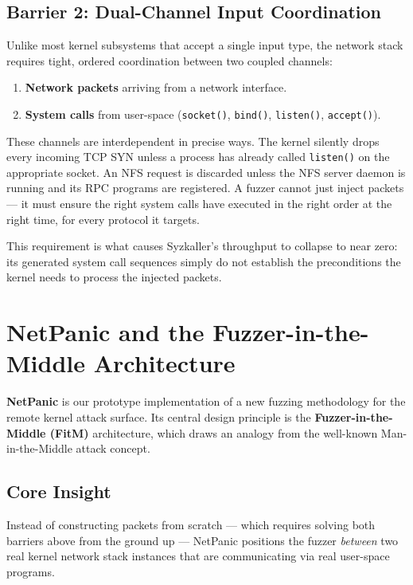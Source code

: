 \documentclass[10pt]{article}
\begin{document}
\subsection{Barrier 2: Dual-Channel Input Coordination}

Unlike most kernel subsystems that accept a single input type, the network stack requires tight, ordered coordination between two coupled channels:

\begin{enumerate}
  \item \textbf{Network packets} arriving from a network interface.
  \item \textbf{System calls} from user-space (\texttt{socket()}, \texttt{bind()}, \texttt{listen()}, \texttt{accept()}).
\end{enumerate}

These channels are interdependent in precise ways. The kernel silently drops every incoming TCP SYN unless a process has already called \texttt{listen()} on the appropriate socket. An NFS request is discarded unless the NFS server daemon is running and its RPC programs are registered. A fuzzer cannot just inject packets --- it must ensure the right system calls have executed in the right order at the right time, for every protocol it targets.

This requirement is what causes Syzkaller's throughput to collapse to near zero: its generated system call sequences simply do not establish the preconditions the kernel needs to process the injected packets.

\section{NetPanic and the Fuzzer-in-the-Middle Architecture}

\textbf{NetPanic} is our prototype implementation of a new fuzzing methodology for the remote kernel attack surface. Its central design principle is the \textbf{Fuzzer-in-the-Middle (FitM)} architecture, which draws an analogy from the well-known Man-in-the-Middle attack concept.

\subsection{Core Insight}

Instead of constructing packets from scratch --- which requires solving both barriers above from the ground up --- NetPanic positions the fuzzer \emph{between} two real kernel network stack instances that are communicating via real user-space programs.
\end{document}
